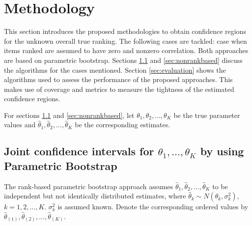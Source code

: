 \documentclass[
  12pt,
  a4paper,
]{article}
\numberwithin{equation}{section}
\begin{document}
\section{Methodology}\label{methodology}

This section introduces the proposed methodologies to obtain confidence regions for the unknown overall true ranking. The following cases are tackled: case when items ranked are assumed to have zero and nonzero correlation. Both approaches are based on parametric bootstrap. Sections \ref{sec:parametricbs} and \ref{sec:nonrankbased} discuss the algorithms for the cases mentioned. Section \ref{sec:evaluation} shows the algorithms used to assess the performance of the proposed approaches. This makes use of coverage and metrics to measure the tightness of the estimated confidence regions.

For sections \ref{sec:parametricbs} and \ref{sec:nonrankbased}, let \(\theta_1, \theta_2, \dots, \theta_K\) be the true parameter values and \(\hat \theta_1, \hat \theta_2, \dots, \hat \theta_K\) be the corresponding estimates.

\subsection{\texorpdfstring{Joint confidence intervals for \(\theta_1, \dots, \theta_K\) by using Parametric Bootstrap}{Joint confidence intervals for \textbackslash theta\_1, \textbackslash dots, \textbackslash theta\_K by using Parametric Bootstrap}}\label{sec:parametricbs}

The rank-based parametric bootstrap approach assumes \(\hat \theta_1, \hat \theta_2, \dots, \hat \theta_K\) to be independent but not identically distributed estimates, where \(\hat{\theta}_k \sim N \left(\theta_k, \sigma_k^2 \right)\), \(k = 1, 2, \dots, K\). \(\sigma^2_k\) is assumed known. Denote the corresponding ordered values by \(\hat \theta_{(1)}, \hat \theta_{(2)}, \dots, \hat \theta_{(K)}\).
\end{document}
